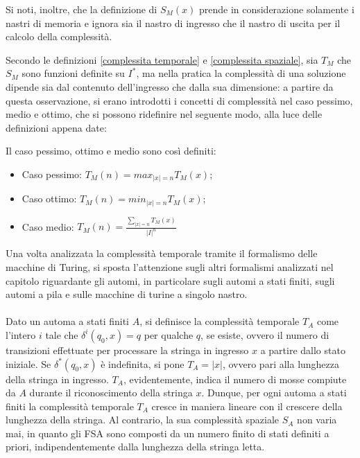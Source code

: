   Si noti, inoltre, che la definizione di \({S}_M(x)\) prende in considerazione solamente i nastri di memoria e ignora sia il nastro di ingresso che il nastro di uscita per il calcolo della complessità.

  Secondo le definizioni \ref{complessita temporale} e \ref{complessita spaziale}, sia \({T}_M\) che \({S}_M\) sono funzioni definite su \(I^*\), ma nella pratica la complessità di una soluzione dipende sia dal contenuto dell'ingresso che dalla sua dimensione: a partire da questa osservazione, si erano introdotti i concetti di complessità nel caso pessimo, medio e ottimo, che si possono ridefinire nel seguente modo, alla luce delle definizioni appena date:

  \begin{definition}
    Il caso pessimo, ottimo e medio sono così definiti:
    \begin{itemize}
      \item Caso pessimo: \({T}_M(n)=max_{|x|=n}{T}_M(x)\);
      \item Caso ottimo: \({T}_M(n)=min_{|x|=n}{T}_M(x)\);
      \item Caso medio: \(\displaystyle {T}_M(n)=\frac{\sum_{|x|=n}{T}_M(x)}{|I|^n}\)
    \end{itemize}
  \end{definition}

  Una volta analizzata la complessità temporale tramite il formalismo delle macchine di Turing, si sposta l'attenzione sugli altri formalismi analizzati nel capitolo riguardante gli automi, in particolare sugli automi a stati finiti, sugli automi a pila e sulle macchine di turine a singolo nastro.

  \paragraph{}
  Dato un automa a stati finiti \(A\), si definisce la complessità temporale \({T}_A\) come l'intero \(i\) tale che \(\delta^i(q_0,x)=q\) per qualche \(q\), se esiste, ovvero il numero di transizioni effettuate per processare la stringa in ingresso \(x\) a partire dallo stato iniziale. Se \(\delta^*(q_0,x)\) è indefinita, si pone \({T}_A= |x|\), ovvero pari alla lunghezza della stringa in ingresso. \({T}_A\), evidentemente, indica il numero di mosse compiute da \(A\) durante il riconoscimento della stringa \(x\). Dunque, per ogni automa a stati finiti la complessità temporale \({T}_A\) cresce in maniera lineare con il crescere della lunghezza della stringa. Al contrario, la sua complessità spaziale \({S}_A\) non varia mai, in quanto gli FSA sono composti da un numero finito di stati definiti a priori, indipendentemente dalla lunghezza della stringa letta. 

